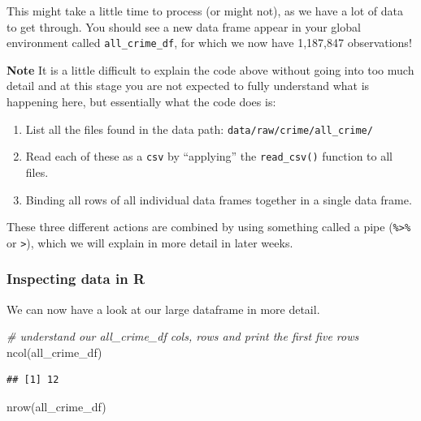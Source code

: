 \documentclass[
]{book}
\newenvironment{Shaded}{\begin{snugshade}}{\end{snugshade}}
\newcommand{\CommentTok}[1]{\textcolor[rgb]{0.56,0.35,0.01}{\textit{#1}}}
\newcommand{\FunctionTok}[1]{\textcolor[rgb]{0.00,0.00,0.00}{#1}}
\newcommand{\NormalTok}[1]{#1}
\providecommand{\tightlist}{%
  \setlength{\itemsep}{0pt}\setlength{\parskip}{0pt}}
\begin{document}
This might take a little time to process (or might not), as we have a lot of data to get through. You should see a new data frame appear in your global environment called \texttt{all\_crime\_df}, for which we now have 1,187,847 observations!

\textbf{Note}
It is a little difficult to explain the code above without going into too much detail and at this stage you are not expected to fully understand what is happening here, but essentially what the code does is:

\begin{enumerate}
\def\labelenumi{\arabic{enumi}.}
\tightlist
\item
  List all the files found in the data path: \texttt{data/raw/crime/all\_crime/}
\item
  Read each of these as a \texttt{csv} by ``applying'' the \texttt{read\_csv()} function to all files.
\item
  Binding all rows of all individual data frames together in a single data frame.
\end{enumerate}

These three different actions are combined by using something called a pipe (\texttt{\%\textgreater{}\%} or \texttt{\textbar{}\textgreater{}}), which we will explain in more detail in later weeks.

\hypertarget{inspecting-data-in-r}{%
\subsubsection{Inspecting data in R}\label{inspecting-data-in-r}}

We can now have a look at our large dataframe in more detail.

\begin{Shaded}
\begin{Highlighting}[]
\CommentTok{\# understand our all\_crime\_df cols, rows and print the first five rows}
\FunctionTok{ncol}\NormalTok{(all\_crime\_df)}
\end{Highlighting}
\end{Shaded}

\begin{verbatim}
## [1] 12
\end{verbatim}

\begin{Shaded}
\begin{Highlighting}[]
\FunctionTok{nrow}\NormalTok{(all\_crime\_df)}
\end{Highlighting}
\end{Shaded}
\end{document}
